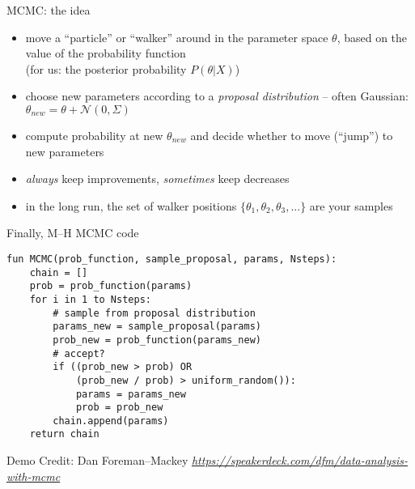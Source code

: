 \documentclass[compress,t]{beamer}
\newcommand{\niceurl}[1]{\mbox{\href{#1}{\textsl{#1}}}}
\begin{document}
\begin{frame}{MCMC: the idea}
  \begin{itemize}
  \item move a ``particle'' or ``walker'' around in the parameter space $\theta$, based on the value of the
    probability function \\ (for us: the posterior probability $P(\theta | X)$)
  \item choose new parameters according to a \emph{proposal distribution}
    -- often Gaussian: $\theta_{new} = \theta + \mathcal{N}(0, \Sigma)$
  \item compute probability at new $\theta_{new}$ and decide whether to move (``jump'') to new parameters
  \item \emph{always} keep improvements, \emph{sometimes} keep decreases
  \item in the long run, the set of walker positions $\{ \theta_1, \theta_2, \theta_3, ... \}$ are your samples
  \end{itemize}
\end{frame}

\begin{frame}[fragile]{Finally, M--H MCMC code}
\begin{verbatim}
fun MCMC(prob_function, sample_proposal, params, Nsteps):
    chain = []
    prob = prob_function(params)
    for i in 1 to Nsteps:
        # sample from proposal distribution
        params_new = sample_proposal(params)
        prob_new = prob_function(params_new)
        # accept?
        if ((prob_new > prob) OR
            (prob_new / prob) > uniform_random()):
            params = params_new
            prob = prob_new
        chain.append(params)
    return chain
\end{verbatim}
\end{frame}

\begin{frame}{Demo}
  Credit: Dan Foreman--Mackey
  \niceurl{https://speakerdeck.com/dfm/data-analysis-with-mcmc}
\end{frame}


{

}
\end{document}
